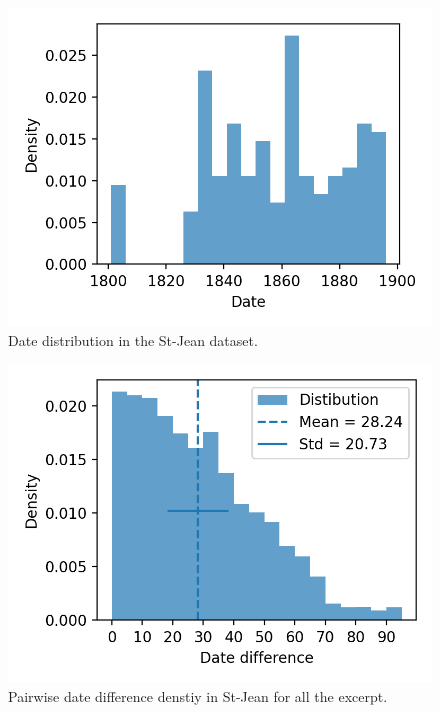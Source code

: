 \begin{figure}
  \includegraphics[width=\linewidth]{img/dates_distribution.png}
  \caption{Date distribution in the St-Jean dataset.}
  \label{fig:dates_distribution}
\end{figure}
\begin{figure}
  \includegraphics[width=\linewidth]{img/dates_differences_all.png}
  \caption{Pairwise date difference denstiy in St-Jean for all the excerpt.}
  \label{fig:dates_differences_all}
\end{figure}

